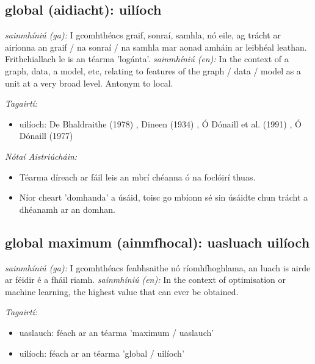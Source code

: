 \documentclass{article}
\begin{document}
\subsection*{global (aidiacht): uilíoch} 
 \noindent \textit{sainmhíniú (ga):} I gcomhthéacs graif, sonraí, samhla, nó eile, ag trácht ar airíonna an graif / na sonraí / na samhla mar aonad amháin ar leibhéal leathan. Frithchiallach le is an téarma 'logánta'.
\newline\newline
 \noindent \textit{sainmhíniú (en):} In the context of a graph, data, a model, etc, relating to features of the graph / data / model as a unit at a very broad level. Antonym to local.
\newline

 \noindent \textit{Tagairtí:}
\begin{itemize}
	\item uilíoch: De Bhaldraithe (1978) \cite{de-bhaldraithe}, Dineen (1934) \cite{dineen}, Ó Dónaill et al. (1991) \cite{focloir-beag}, Ó Dónaill (1977) \cite{odonaill}
\end{itemize}

 \noindent \textit{Nótaí Aistriúcháin:}
\begin{itemize}
	\item Téarma díreach ar fáil leis an mbrí chéanna ó na foclóirí thuas.
	\item Níor cheart 'domhanda' a úsáid, toisc go mbíonn sé sin úsáidte chun trácht a dhéanamh ar an domhan.
\end{itemize}


\subsection*{global maximum (ainmfhocal): uasluach uilíoch} 
 \noindent \textit{sainmhíniú (ga):} I gcomhthéacs feabhsaithe nó ríomhfhoghlama, an luach is airde ar féidir é a fháil riamh.
\newline\newline
 \noindent \textit{sainmhíniú (en):} In the context of optimisation or machine learning, the highest value that can ever be obtained.
\newline

 \noindent \textit{Tagairtí:}
\begin{itemize}
	\item uaslauch: féach ar an téarma 'maximum / uaslauch'
	\item uilíoch: féach ar an téarma 'global / uilíoch'
\end{itemize}
\end{document}
